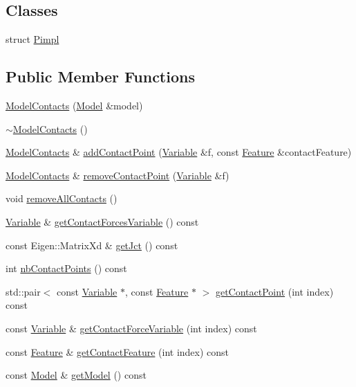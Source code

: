 \subsection*{Classes}
\begin{DoxyCompactItemize}
\item 
struct \hyperlink{structocra_1_1ModelContacts_1_1Pimpl}{Pimpl}
\end{DoxyCompactItemize}
\subsection*{Public Member Functions}
\begin{DoxyCompactItemize}
\item 
\hyperlink{classocra_1_1ModelContacts_abf9089d7762205480b46005544883e60}{Model\+Contacts} (\hyperlink{classocra_1_1Model}{Model} \&model)
\item 
\hyperlink{classocra_1_1ModelContacts_ab8ca6e653ccacdff73ae10e7c0750bbf}{$\sim$\+Model\+Contacts} ()
\item 
\hyperlink{classocra_1_1ModelContacts}{Model\+Contacts} \& \hyperlink{classocra_1_1ModelContacts_a209ae06f99698291a84e043fa7b8e32e}{add\+Contact\+Point} (\hyperlink{classocra_1_1Variable}{Variable} \&f, const \hyperlink{classocra_1_1Feature}{Feature} \&contact\+Feature)
\item 
\hyperlink{classocra_1_1ModelContacts}{Model\+Contacts} \& \hyperlink{classocra_1_1ModelContacts_a4e2267a563e01c78c9aff1fced5cb83b}{remove\+Contact\+Point} (\hyperlink{classocra_1_1Variable}{Variable} \&f)
\item 
void \hyperlink{classocra_1_1ModelContacts_ad633a3df5915ee16b3a55b8169e4006e}{remove\+All\+Contacts} ()
\item 
\hyperlink{classocra_1_1Variable}{Variable} \& \hyperlink{classocra_1_1ModelContacts_a50b258ef214bdc1b19a025a3867e5192}{get\+Contact\+Forces\+Variable} () const 
\item 
const Eigen\+::\+Matrix\+Xd \& \hyperlink{classocra_1_1ModelContacts_aa7e793d03663bc8da729884ca873e03a}{get\+Jct} () const 
\item 
int \hyperlink{classocra_1_1ModelContacts_afdab477926cf23683eada986a724ce7e}{nb\+Contact\+Points} () const 
\item 
std\+::pair$<$ const \hyperlink{classocra_1_1Variable}{Variable} $\ast$, const \hyperlink{classocra_1_1Feature}{Feature} $\ast$ $>$ \hyperlink{classocra_1_1ModelContacts_afa3599c206dd13e7b8a9091f43c43198}{get\+Contact\+Point} (int index) const 
\item 
const \hyperlink{classocra_1_1Variable}{Variable} \& \hyperlink{classocra_1_1ModelContacts_a27836a68aaf0f436f27ca28367d252d6}{get\+Contact\+Force\+Variable} (int index) const 
\item 
const \hyperlink{classocra_1_1Feature}{Feature} \& \hyperlink{classocra_1_1ModelContacts_afda5549d65be3b6ee5aec268ac4265ed}{get\+Contact\+Feature} (int index) const 
\item 
const \hyperlink{classocra_1_1Model}{Model} \& \hyperlink{classocra_1_1ModelContacts_a155dd46dace31594584922eade6e12d6}{get\+Model} () const 
\end{DoxyCompactItemize}
